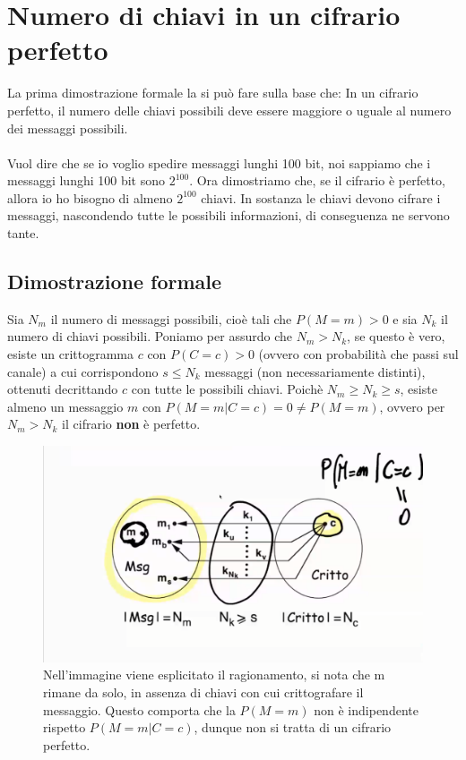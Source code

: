 \section{Numero di chiavi in un cifrario perfetto}
La prima dimostrazione formale la si può fare sulla base che:
In un cifrario perfetto, il numero delle chiavi possibili deve essere maggiore o uguale al numero dei messaggi possibili. \\\\
Vuol dire che se io voglio spedire messaggi lunghi 100 bit, noi sappiamo che i messaggi lunghi 100 bit sono $2^{100}$. Ora dimostriamo che, se il cifrario è perfetto, allora io ho bisogno di almeno $2^{100}$ chiavi. In sostanza le chiavi devono cifrare i messaggi, nascondendo tutte le possibili informazioni, di conseguenza ne servono tante.
\subsection{Dimostrazione formale}
Sia $N_m$ il numero di messaggi possibili, cioè tali che $P(M = m) > 0$ e sia $N_k$ il numero di chiavi possibili. Poniamo per assurdo che $N_m > N_k$, se questo è vero, esiste un crittogramma $c$ con $P(C = c) > 0 $ (ovvero con probabilità che passi sul canale) a cui corrispondono $s \leq N_k$ messaggi (non necessariamente distinti), ottenuti decrittando $c$ con tutte le possibili chiavi. Poichè $N_m \geq N_k \geq s$, esiste almeno un messaggio $m$ con $P(M = m | C = c) = 0 \neq P(M = m)$, ovvero per $N_m > N_k$ il cifrario \textbf{non} è perfetto.

\begin{figure}[htp]
	\includegraphics[width=0.8\linewidth]{./img/teorema1.png}
	\caption{Nell'immagine viene esplicitato il ragionamento, si nota che m rimane da solo, in assenza di chiavi con cui crittografare il messaggio. Questo comporta che la $P(M = m)$ non è indipendente rispetto $P(M = m | C = c)$, dunque non si tratta di un cifrario perfetto.}
	\label{img:teorema1}
\end{figure}

